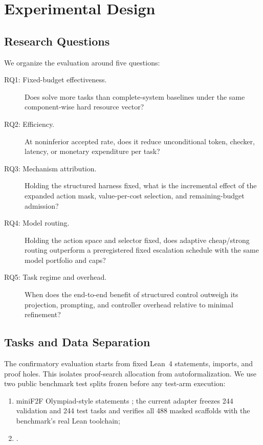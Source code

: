 \section{Experimental Design}

\subsection{Research Questions}

We organize the evaluation around five questions:

\begin{description}
\item[RQ1: Fixed-budget effectiveness.] Does \system{} solve more tasks than
    complete-system baselines under the same component-wise hard resource
    vector?
    \item[RQ2: Efficiency.] At noninferior accepted rate, does it reduce
    unconditional token, checker, latency, or monetary expenditure per task?
    \item[RQ3: Mechanism attribution.] Holding the structured harness fixed,
    what is the incremental effect of the expanded action mask, value-per-cost
    selection, and remaining-budget admission?
    \item[RQ4: Model routing.] Holding the action space and selector fixed,
    does adaptive cheap/strong routing outperform a preregistered fixed
    escalation schedule with the same model portfolio and caps?
    \item[RQ5: Task regime and overhead.] When does the end-to-end benefit of
    structured control outweigh its projection, prompting, and controller
    overhead relative to minimal refinement?
\end{description}

\subsection{Tasks and Data Separation}

The confirmatory evaluation starts from fixed Lean~4 statements, imports, and
proof holes. This isolates proof-search allocation from autoformalization. We
use two public benchmark test splits frozen before any test-arm execution:

\begin{enumerate}
    \item miniF2F Olympiad-style statements
    \cite{zheng2021minif2f}; the current adapter freezes 244 validation and
    244 test tasks and verifies all 488 masked scaffolds with the benchmark's
    real Lean toolchain;
    \item {}.
\end{enumerate}

